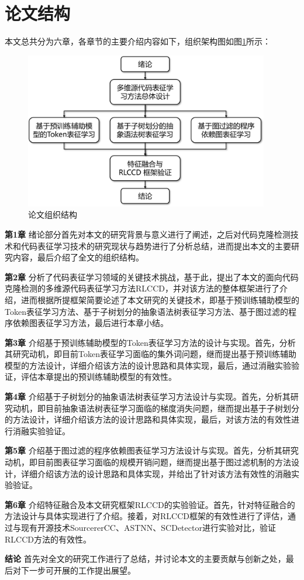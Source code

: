 \section{论文结构}
\label{sec:Summary1}
本文总共分为六章，各章节的主要介绍内容如下，组织架构图如图\ref{fig:Structure}所示：

\begin{figure}[H]
    \centering
    \includegraphics[width=0.95\textwidth]{figures/Structure}
    \caption{论文组织结构}\label{fig:Structure}
\end{figure}

\textbf{第1章} \quad 绪论部分首先对本文的研究背景与意义进行了阐述，之后对代码克隆检测技术和代码表征学习技术的研究现状与趋势进行了分析总结，进而提出本文的主要研究内容，最后介绍了全文的组织结构。

\textbf{第2章}  \quad 分析了代码表征学习领域的关键技术挑战，基于此，提出了本文的面向代码克隆检测的多维源代码表征学习方法RLCCD，并对该方法的整体框架进行了介绍，进而根据所提框架简要论述了本文研究的关键技术，即基于预训练辅助模型的Token表征学习方法、基于子树划分的抽象语法树表征学习方法、基于图过滤的程序依赖图表征学习方法，最后进行本章小结。

\textbf{第3章}  \quad 介绍基于预训练辅助模型的Token表征学习方法的设计与实现。首先，分析其研究动机，即目前Token表征学习面临的集外词问题，继而提出基于预训练辅助模型的方法设计，详细介绍该方法的设计思路和具体实现，最后，通过消融实验验证，评估本章提出的预训练辅助模型的有效性。

\textbf{第4章}  \quad 介绍基于子树划分的抽象语法树表征学习方法设计与实现。首先，分析其研究动机，即目前抽象语法树表征学习面临的梯度消失问题，继而提出基于子树划分的方法设计，详细介绍该方法的设计思路和具体实现，最后，对该方法的有效性进行消融实验验证。

\textbf{第5章}  \quad 介绍基于图过滤的程序依赖图表征学习方法设计与实现。首先，分析其研究动机，即目前图表征学习面临的规模开销问题，继而提出基于图过滤机制的方法设计，详细介绍该方法的设计思路和具体实现，并给出了针对该方法有效性的消融实验验证。

\textbf{第6章}  \quad 介绍特征融合及本文研究框架RLCCD的实验验证。首先，针对特征融合的方法设计与具体实现进行了介绍。接着，对RLCCD框架的有效性进行了评估，通过与现有开源技术SourcererCC\cite{7886988}、ASTNN\cite{8812062}、SCDetector\cite{10.1145/3324884.3416562}进行实验对比，验证RLCCD方法的有效性。

\textbf{结论}  \quad 首先对全文的研究工作进行了总结，并讨论本文的主要贡献与创新之处，最后对下一步可开展的工作提出展望。
